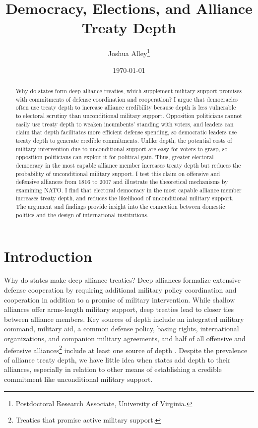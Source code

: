 \documentclass[12pt]{article}
\title{\textbf{Democracy, Elections, and Alliance Treaty Depth}}
\author{Joshua Alley\footnote{Postdoctoral Research Associate,
University of Virginia.}}
\date{\today}
\begin{document}
\maketitle 

\doublespace 

\begin{abstract}
Why do states form deep alliance treaties, which supplement military support promises with commitments of defense coordination and cooperation? 
I argue that democracies often use treaty depth to increase alliance credibility because depth is less vulnerable to electoral scrutiny than unconditional military support. 
Opposition politicians cannot easily use treaty depth to weaken incumbents' standing with voters, and leaders can claim that depth facilitates more efficient defense spending, so democratic leaders use treaty depth to generate credible commitments. 
Unlike depth, the potential costs of military intervention due to unconditional support are easy for voters to grasp, so opposition politicians can exploit it for political gain. 
Thus, greater electoral democracy in the most capable alliance member increases treaty depth but reduces the probability of unconditional military support. 
I test this claim on offensive and defensive alliances from 1816 to 2007 and illustrate the theoretical mechanisms by examining NATO. 
I find that electoral democracy in the most capable alliance member increases treaty depth, and reduces the likelihood of unconditional military support. 
The argument and findings provide insight into the connection between domestic politics and the design of international institutions. 
\end{abstract}


\newpage 


\section{Introduction}


Why do states make deep alliance treaties? 
Deep alliances formalize extensive defense cooperation by requiring additional military policy coordination and cooperation in addition to a promise of military intervention. 
While shallow alliances offer arms-length military support, deep treaties lead to closer ties between alliance members. 
Key sources of depth include an integrated military command, military aid, a common defense policy, basing rights, international organizations, and companion military agreements, and half of all offensive and defensive alliances\footnote{Treaties that promise active military support.} include at least one source of depth \citep{Leedsetal2002}. 
Despite the prevalence of alliance treaty depth, we have little idea when states add depth to their alliances, especially in relation to other means of establishing a credible commitment like unconditional military support. 
\end{document}
